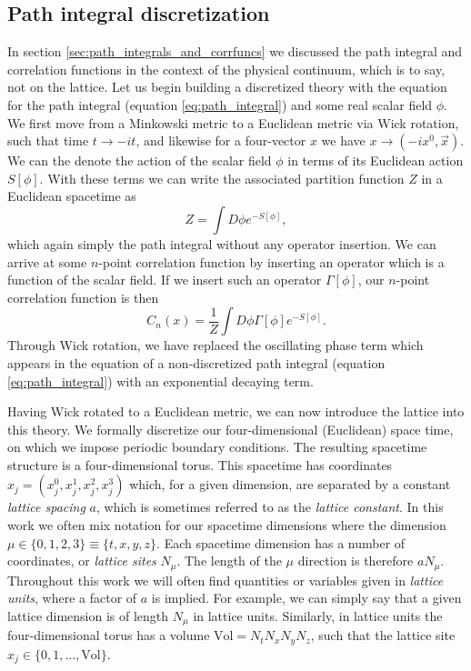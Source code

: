 \subsection{Path integral discretization}\label{sec:path_integral_discretization}
In section \ref{sec:path_integrals_and_corrfuncs} we discussed the path integral and correlation functions in the context of the physical continuum, which is to say, not on the lattice.  Let us begin building a discretized theory with the equation for the path integral (equation \ref{eq:path_integral}) and some real scalar field $\phi$.  We first move from a Minkowski metric to a Euclidean metric via Wick rotation, such that time $t\rightarrow -it$, and likewise for a four-vector $x$ we have $x \rightarrow (-ix^0,\vec{x})$.  We can the denote the action of the scalar field $\phi$ in terms of its Euclidean action $S[\phi]$.  With these terms we can write the associated partition function $Z$ in a Euclidean spacetime as
\begin{equation}\label{eq:partition_funciton_full}
    Z = \int D\phi e^{-S[\phi]},
\end{equation}
which again simply the path integral without any operator insertion.  We can arrive at some $n$-point correlation function by inserting an operator which is a function of the scalar field.  If we insert such an operator $\Gamma[\phi]$, our $n$-point correlation function is then
\begin{equation}\label{eq:n-point_corr_func}
    C_n(x) = \frac{1}{Z} \int D\phi\Gamma[\phi] e^{-S[\phi]}.
\end{equation}
Through Wick rotation, we have replaced the oscillating phase term which appears in the equation of a non-discretized path integral (equation \ref{eq:path_integral}) with an exponential decaying term.  

Having Wick rotated to a Euclidean metric, we can now introduce the lattice into this theory.  We formally discretize our four-dimensional (Euclidean) space time, on which we impose periodic boundary conditions.  The resulting spacetime structure is a four-dimensional torus.  This spacetime has coordinates $x_j = (x^0_j, x^1_j, x^2_j, x^3_j)$ which, for a given dimension, are separated by a constant \textit{lattice spacing} $a$, which is sometimes referred to as the \textit{lattice constant}.  In this work we often mix notation for our spacetime dimensions where the dimension $\mu \in \{0,1,2,3\} \equiv\{t,x,y,z\}$.  Each spacetime dimension has a number of coordinates, or \textit{lattice sites} $N_\mu$.  The length of the $\mu$ direction is therefore $aN_\mu$. Throughout this work we will often find quantities or variables given in \textit{lattice units}, where a factor of $a$ is implied.  For example, we can simply say that a given lattice dimension is of length $N_\mu$ in lattice units.  Similarly, in lattice units the four-dimensional torus has a volume $\mathrm{Vol}=N_tN_xN_yN_z$, such that the lattice site $x_j \in \{0,1,...,\mathrm{Vol}\}$.

